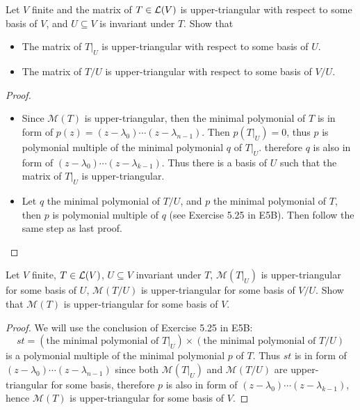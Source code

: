 \documentclass[../main.tex]{subfiles}
\begin{document}
\begin{exercise}
  Let $V$ finite and the matrix of $T \in \mathcal{L}(V)$ is upper-triangular with respect to some basis of $V$,
  and $U \subseteq V$ is invariant under $T$.
  Show that
  \begin{itemize}
    \item The matrix of $T\big|_U$ is upper-triangular with respect to some basis of $U$.
    \item The matrix of $T/U$ is upper-triangular with respect to some basis of $V/U$.
  \end{itemize}
\end{exercise}
\begin{proof}
  ~
  \begin{itemize}
    \item Since $\mathcal{M}(T)$ is upper-triangular, then the minimal polymonial of $T$
          is in form of $p(z) = (z - \lambda_0) \cdots (z - \lambda_{n - 1})$.
          Then $p(T\big|_U) = 0$, thus $p$ is polymonial multiple of the minimal polymonial $q$ of $T\big|_U$.
          therefore $q$ is also in form of $(z - \lambda_0) \cdots (z - \lambda_{k - 1})$.
          Thus there is a basis of $U$ such that the matrix of $T\big|_U$ is upper-triangular.
    \item Let $q$ the minimal polymonial of $T/U$, and $p$ the minimal polymonial of $T$, 
          then $p$ is polymonial multiple of $q$ (see Exercise 5.25 in E5B).
          Then follow the same step as last proof.
  \end{itemize}
\end{proof}

\begin{exercise}
  Let $V$ finite, $T \in \mathcal{L}(V)$, $U \subseteq V$ invariant under $T$,
  $\mathcal{M}(T\big|_U)$ is upper-triangular for some basis of $U$,
  $\mathcal{M}(T/U)$ is upper-triangular for some basis of $V/U$.
  Show that $\mathcal{M}(T)$ is upper-triangular for some basis of $V$.
\end{exercise}
\begin{proof}
  We will use the conclusion of Exercise 5.25 in E5B: 
  \[
  st = (\text{the minimal polymonial of } T\big|_U) \times (\text{the minimal polymonial of } T/U)
  \]
  is a polymonial multiple of the minimal polymonial $p$ of $T$.
  Thus $st$ is in form of $(z - \lambda_0) \cdots (z - \lambda_{n - 1})$
  since both $\mathcal{M}(T\big|_U)$ and $\mathcal{M}(T/U)$ are upper-triangular
  for some basis, therefore $p$ is also in form of $(z - \lambda_0) \cdots (z - \lambda_{k - 1})$,
  hence $\mathcal{M}(T)$ is upper-triangular for some basis of $V$.
\end{proof}
\end{document}
